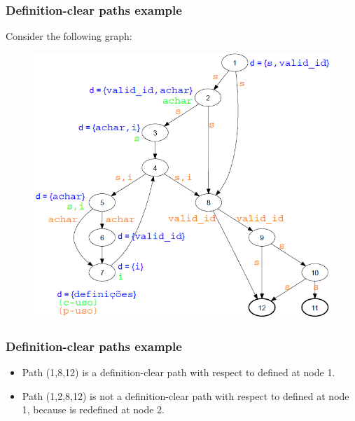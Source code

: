 \begin{frame}[hasprev=false,hasnext=true]
\label{example:identifier-def-clear-path}
\frametitle{Definition-clear paths example}

Consider the following graph:

\begin{figure}
	\centering
	\includegraphics[scale=.3]{aux/examples/identifier-def-clear-path/identifier-java-dug}
\end{figure}

\end{frame}



\begin{frame}[hasprev=true,hasnext=false]
\frametitle{Definition-clear paths example}

\begin{itemize}
	\item Path (1,8,12) is a definition-clear path with respect to
	 defined at node 1.

	\item Path (1,2,8,12) is not a definition-clear path with respect to
	 defined at node 1, because  is
	redefined at node 2.
\end{itemize}

\end{frame}